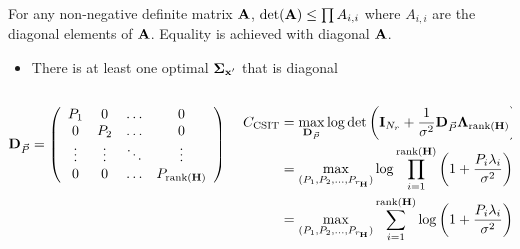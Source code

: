 \documentclass[xcolor=dvipsnames,aspectratio=169]{beamer}
\begin{document}
{\begin{theorem}
  For any non-negative definite matrix $\mathbf{A}$, $\det(\mathbf{A})\leq \prod A_{i,i}$ where $A_{i,i}$ are the diagonal elements of $\mathbf{A}$. Equality is achieved with diagonal $\mathbf{A}$.
 \end{theorem}
 \begin{itemize}
  \item There is at least one optimal $\mathbf{\boldsymbol{\Sigma}}_{\mathbf{x}'}$ that is diagonal
 \end{itemize}
\begin{columns}
 \begin{column}{6cm}
  $$\mathbf{D}_{\vec{P}}=\left(\begin{array}{cccc}
 P_1&0&\dots&0\\
 0&P_2&\dots&0\\
 \vdots&\vdots&\ddots&\vdots\\
 0&0&\dots&P_{\textnormal{rank}(\mathbf{H})}\\
\end{array}\right)$$  
 \end{column}
 \begin{column}{6cm}
 \begin{equation*}
  \begin{split}
    C_{\textnormal{CSIT}}&= \max_{\mathbf{D}_{\vec{P}}}\log\det \left(\mathbf{I}_{N_{r}}+\frac{1}{\sigma^2}\mathbf{D}_{\vec{P}}\mathbf{\boldsymbol{\Lambda}}_{\textnormal{rank}(\mathbf{H})}\right)\\
        &= \max_{(P_1,P_2,\dots,P_{r_{\mathbf{H}}})}\log\prod_{i=1}^{\textnormal{rank}(\mathbf{H})} \left(1+\frac{P_i\lambda_i}{\sigma^2}\right)\\
        &= \max_{(P_1,P_2,\dots,P_{r_{\mathbf{H}}})}\sum_{i=1}^{\textnormal{rank}(\mathbf{H})}\log \left(1+\frac{P_i\lambda_i}{\sigma^2}\right)\\
  \end{split}
 \end{equation*}
 \end{column}
\end{columns}
}
\end{document}
